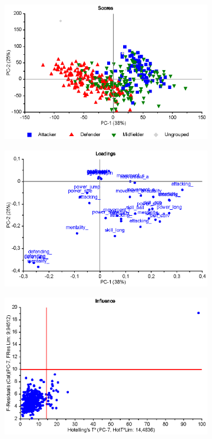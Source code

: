 \begin{figure}[h]
 	\centering
 	\begin{subfigure}[t]{0.48\textwidth}
 		\centering
 		\includegraphics[width=\textwidth]{figurer/fifa-pca2-scores}
 		\caption{}
 		\label{}
 	\end{subfigure}	
 	\begin{subfigure}[t]{0.48\textwidth}
 		\centering
 		\includegraphics[width=\textwidth]{figurer/fifa-pca2-loadings}
 		\caption{}
 		\label{}
 	\end{subfigure}
 	\begin{subfigure}[t]{0.48\textwidth}
 		\centering
 		\includegraphics[width=\textwidth]{figurer/fifa-pca2-influence}

\end{subfigure}
\end{figure}
